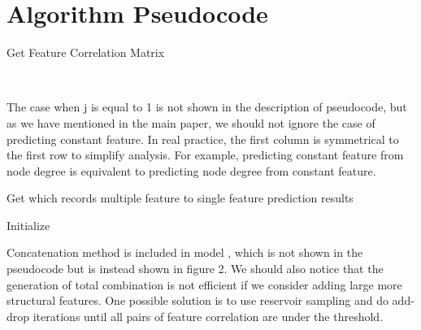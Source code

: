 \documentclass[runningheads]{llncs}
\begin{document}
\section{Algorithm Pseudocode}
\vspace{-1cm}
\begin{algorithm}[!htp]
  \caption{Get Feature Correlation Matrix}
  \\
  \end{algorithm}
\vspace{-0.8cm}
The case when j is equal to 1 is not shown in the description of pseudocode, but as we have mentioned in the main paper, we should not ignore the case of predicting constant feature. In real practice, the first column is symmetrical to the first row to simplify analysis. For example, predicting constant feature from node degree is equivalent to predicting node degree from constant feature.
\vspace{-0.5cm}
\begin{algorithm}[!htp]
  \caption{Get  which records multiple feature to 
single 
feature prediction results}
  Initialize  \\

\For{  }{
      \\
      \\
       \\
      \\

  }
  \end{algorithm}
  
\vspace{-0.8cm}
Concatenation method is included in model , which is not shown in the pseudocode but is instead shown in figure 2. We should also notice that the generation of total combination is not efficient if we consider adding large more structural features. One possible solution is to use reservoir sampling and do add-drop iterations until all pairs of feature correlation are under the threshold.
\end{document}
